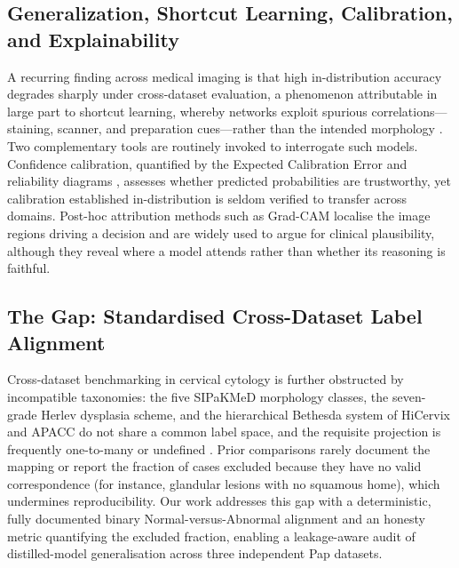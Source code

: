 \documentclass[twocolumn]{article}
\begin{document}
\subsection{Generalization, Shortcut Learning, Calibration, and Explainability}
A recurring finding across medical imaging is that high in-distribution accuracy degrades sharply under cross-dataset evaluation, a phenomenon attributable in large part to shortcut learning, whereby networks exploit spurious correlations---staining, scanner, and preparation cues---rather than the intended morphology \citep{geirhos2020shortcut}. Two complementary tools are routinely invoked to interrogate such models. Confidence calibration, quantified by the Expected Calibration Error and reliability diagrams \citep{guo2017calibration}, assesses whether predicted probabilities are trustworthy, yet calibration established in-distribution is seldom verified to transfer across domains. Post-hoc attribution methods such as Grad-CAM \citep{selvaraju2017gradcam} localise the image regions driving a decision and are widely used to argue for clinical plausibility, although they reveal where a model attends rather than whether its reasoning is faithful.

\subsection{The Gap: Standardised Cross-Dataset Label Alignment}
Cross-dataset benchmarking in cervical cytology is further obstructed by incompatible taxonomies: the five SIPaKMeD morphology classes, the seven-grade Herlev dysplasia scheme, and the hierarchical Bethesda system of HiCervix and APACC do not share a common label space, and the requisite projection is frequently one-to-many or undefined \citep{nayar2015bethesda}. Prior comparisons rarely document the mapping or report the fraction of cases excluded because they have no valid correspondence (for instance, glandular lesions with no squamous home), which undermines reproducibility. Our work addresses this gap with a deterministic, fully documented binary Normal-versus-Abnormal alignment and an honesty metric quantifying the excluded fraction, enabling a leakage-aware audit of distilled-model generalisation across three independent Pap datasets.
\end{document}
